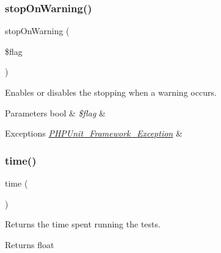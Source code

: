 \subsubsection{\texorpdfstring{stop\+On\+Warning()}{stopOnWarning()}}
{\footnotesize\ttfamily stop\+On\+Warning (\begin{DoxyParamCaption}\item[{}]{\$flag }\end{DoxyParamCaption})}

Enables or disables the stopping when a warning occurs.


\begin{DoxyParams}[1]{Parameters}
bool & {\em \$flag} & \\
\hline
\end{DoxyParams}

\begin{DoxyExceptions}{Exceptions}
{\em \mbox{\hyperlink{class_p_h_p_unit___framework___exception}{P\+H\+P\+Unit\+\_\+\+Framework\+\_\+\+Exception}}} & \\
\hline
\end{DoxyExceptions}
\mbox{\label{class_p_h_p_unit___framework___test_result_ad0150b710cab9ab24923212cbf226447}} 
\subsubsection{\texorpdfstring{time()}{time()}}
{\footnotesize\ttfamily time (\begin{DoxyParamCaption}{ }\end{DoxyParamCaption})}

Returns the time spent running the tests.

\begin{DoxyReturn}{Returns}
float 
\end{DoxyReturn}
\mbox{\label{class_p_h_p_unit___framework___test_result_aa33c8c3faf0ba9df95724156d2781d79}} 
